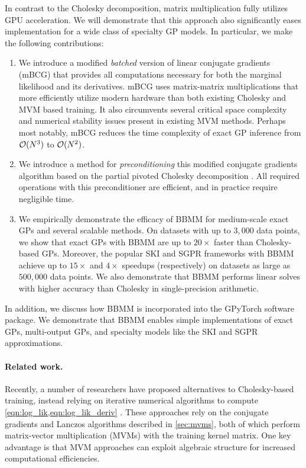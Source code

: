 In contrast to the Cholesky decomposition, matrix multiplication fully utilizes GPU acceleration.
We will demonstrate that this approach also significantly eases implementation for a wide class of specialty GP models.
In particular, we make the following contributions:

\begin{enumerate}
	\item
    We introduce a modified \emph{batched} version of linear conjugate gradients (mBCG) that provides all computations necessary for both the marginal likelihood and its derivatives.
		mBCG uses matrix-matrix multiplications that more efficiently utilize modern hardware than both existing Cholesky and MVM based training.
		It also circumvents several critical space complexity and numerical stability issues present in existing MVM methods.
		Perhaps most notably, mBCG reduces the time complexity of exact GP inference from $\bigo{N^3}$ to $\bigo{N^2}$.

	\item We introduce a method for \emph{preconditioning} this modified conjugate gradients algorithm based on the partial pivoted Cholesky decomposition \cite{harbrecht2012low}.
		All required operations with this preconditioner are efficient, and in practice require negligible time.

	\item We empirically demonstrate the efficacy of BBMM for medium-scale exact GPs and several scalable methods.
		On datasets with up to $3,\!000$ data points, we show that exact GPs with BBMM are up to $20\times$ faster than Cholesky-based GPs.
		Moreover, the popular SKI \cite{wilson2015kernel} and SGPR \cite{titsias2009variational} frameworks with BBMM achieve up to $15\times$ and $4\times$ speedups (respectively) on datasets as large as $500,\!000$ data points.
		We also demonstrate that BBMM performs linear solves with higher accuracy than Cholesky in single-precision arithmetic.
\end{enumerate}
%
\noindent
In addition, we discuss how BBMM is incorporated into the GPyTorch software package.
We demonstrate that BBMM enables simple implementations of exact GPs, multi-output GPs, and specialty models like the SKI and SGPR approximations.

\paragraph{Related work.}
Recently, a number of researchers have proposed alternatives to Cholesky-based training, instead relying on iterative numerical algorithms to compute \cref{eqn:log_lik,eqn:log_lik_deriv} \cite{cunningham2008fast,murray2009gaussian,saatcci2012scalable,wilson2014thesis,wilson2015kernel,cutajar2016preconditioning,dong2017scalable,gardner2018product}.
These approaches rely on the conjugate gradients and Lanczos algorithms described in \cref{sec:mvms}, both of which perform matrix-vector multiplication (MVMs) with the training kernel matrix.
One key advantage is that MVM approaches can exploit algebraic structure for increased computational efficiencies.

